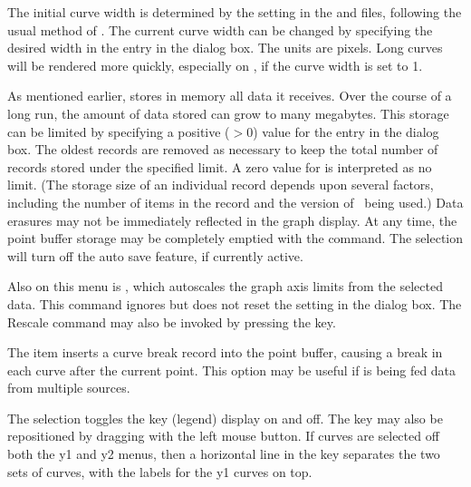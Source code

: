 The initial curve width is determined by the  setting in the  and
 files, following the usual method of
.  The current
curve width can be changed by specifying the desired width in the
 entry in the {} dialog
box.  The units are pixels.  Long curves will be rendered more quickly,
especially on \Windows, if the curve width is set to 1.

As mentioned earlier,  stores in memory all data it
receives.  Over the course of a long run, the amount of data stored can
grow to many megabytes.  This storage can be limited
by specifying a positive ($>0$) value for the 
entry in the {} dialog box.  The oldest
records are removed as necessary to keep the total number of records
stored under the specified limit.  A zero value for  is interpreted as no limit.  (The storage size of an individual
record depends upon several factors, including the number of items in
the record and the version of \Tcl\ being used.)  Data erasures may not
be immediately reflected in the graph display.  At any time, the point
buffer storage may be completely emptied with the  command.  The  selection
will turn off the auto save feature, if currently active.

Also on this menu is , which autoscales the
graph axis limits from the selected data.  This command ignores but does
not reset the  setting in the  dialog box.  The Rescale command may also be invoked by
pressing the  key.

The  item inserts a curve break record
into the point buffer, causing a break in each curve after the current
point.  This option may be useful if  is being fed data
from multiple sources.

The  selection toggles the key (legend) display on
and off.  The key may also be repositioned by dragging with the left
mouse button.  If curves are selected off both the y1 and y2 menus, then
a horizontal line in the key separates the two sets of curves, with the
labels for the y1 curves on top.

